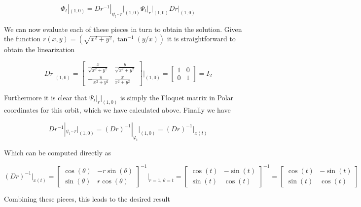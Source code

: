 \documentclass{article}
\begin{document}
\begin{equation*}
	\Phi_t|_{(1,0)} = Dr^{-1}|_{\psi_t \circ r}\biggl\rvert_{(1,0)}\Psi_t|_r\biggl\rvert_{(1,0)}Dr\biggl\rvert_{(1,0)}
\end{equation*}

We can now evaluate each of these pieces in turn to obtain the solution. Given the function 
$r(x,y) = (\sqrt{x^2+y^2},\tan^{-1}(y/x))$ it is straightforward to obtain the linearization 

\begin{equation*}
	Dr|_{(1,0)} = 
	\begin{bmatrix}
		\frac{x}{\sqrt{x^2+y^2}} & \frac{y}{\sqrt{x^2+y^2}} \\ -\frac{y}{x^2+y^2} & \frac{x}{x^2+y^2}
	\end{bmatrix} \biggl \rvert_{(1,0)}
	= 
	\begin{bmatrix}
		1 & 0 \\ 0 & 1 
	\end{bmatrix}
	= I_2
\end{equation*}

Furthermore it is clear that $\Psi_t|_r\biggl\rvert_{(1,0)}$ is simply the Floquet matrix in Polar 
coordinates for this orbit, which we have calculated above. Finally we have 

\begin{equation*}
	Dr^{-1}|_{\psi_t \circ r}\biggl\rvert_{(1,0)} = (Dr)^{-1}|_{\varphi_t}\biggl\rvert_{(1,0)} = (Dr)^{-1}|_{x(t)}
\end{equation*}

Which can be computed directly as 

\begin{equation*}
	(Dr)^{-1}|_{x(t)} = 
	\begin{bmatrix}
		\cos(\theta) & -r\sin(\theta) \\ \sin(\theta) & r\cos(\theta)
	\end{bmatrix}^{-1}\biggr\rvert_{r=1,\,\theta = t}
	=
	\begin{bmatrix}
		\cos(t) & -\sin(t) \\ \sin(t) & \cos(t)
	\end{bmatrix}^{-1} 
	= 
	\begin{bmatrix}
		\cos(t) & -\sin(t) \\ \sin(t) & \cos(t)
	\end{bmatrix}
\end{equation*}

Combining these pieces, this leads to the desired result
\end{document}
